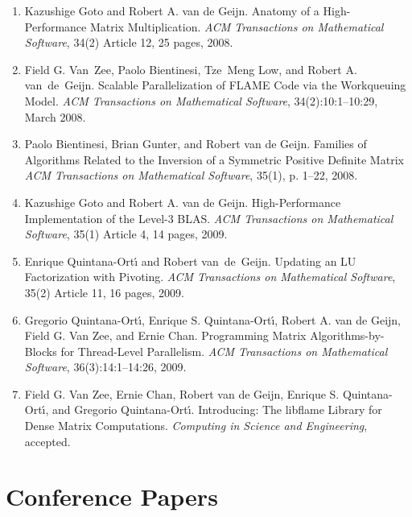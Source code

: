 \begin{enumerate}
\item
Kazushige Goto and Robert A. van de Geijn.
\newblock
Anatomy of a High-Performance Matrix Multiplication.
\newblock
{\em ACM Transactions on Mathematical Software},
34(2) Article 12, 25 pages, 2008.

\item
 Field G. Van~Zee, Paolo Bientinesi, Tze~Meng Low, and Robert A. van~de~Geijn. 
\newblock
Scalable Parallelization of FLAME Code via the Workqueuing
Model.
\newblock
{\em  ACM Transactions on Mathematical Software},
34(2):10:1--10:29, March 2008.

\item
Paolo Bientinesi, Brian Gunter,
and Robert van de Geijn.
\newblock
Families of Algorithms Related to the Inversion of a Symmetric Positive
Definite Matrix
\newblock
{\em ACM Transactions on Mathematical Software},
35(1), p. 1--22, 2008.

\item
Kazushige Goto and Robert A. van de Geijn.
\newblock
High-Performance Implementation of the Level-3 BLAS.
\newblock
{\em ACM Transactions on Mathematical Software},
35(1) Article 4, 14 pages, 2009.

\item
Enrique Quintana-Ort\'{\i} and Robert van~de~Geijn. 
\newblock
Updating an LU Factorization with Pivoting.
\newblock
{\em ACM Transactions on Mathematical Software},
35(2) Article 11, 16 pages, 2009.

\item
Gregorio Quintana-Ort\'{\i}, Enrique S. Quintana-Ort\'{\i},
Robert A. van de Geijn, Field G. Van Zee, and Ernie Chan.
\newblock
Programming Matrix Algorithms-by-Blocks for Thread-Level Parallelism.
\newblock
{\em ACM Transactions on Mathematical Software},
36(3):14:1--14:26, 2009.

\item
Field G. Van Zee, Ernie Chan, Robert van de Geijn,
Enrique S. Quintana-Ort\'{\i}, and Gregorio Quintana-Ort\'{\i}.
\newblock
Introducing: The libflame Library for Dense Matrix Computations.
\newblock
{\em Computing in Science and Engineering},
accepted.  

\end{enumerate}

\section{Conference Papers}

\renewcommand\labelenumi{C\theenumi}

